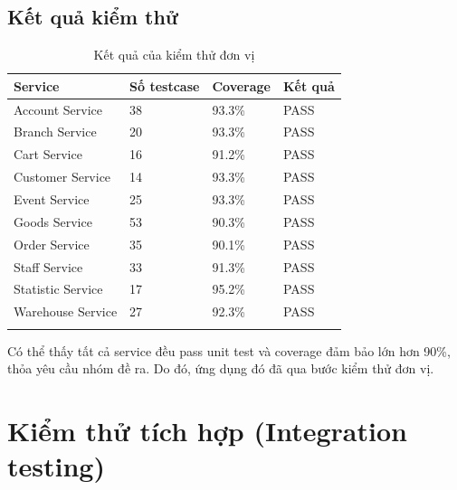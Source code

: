\subsection{Kết quả kiểm thử}
{
    \setlength\extrarowheight{6pt}
    \begin{longtable}{| p{4cm}| p{4cm}| p{4cm}| p{4cm} |}
        \hline
        \textbf{Service} &  \textbf{Số testcase}  & \textbf{Coverage} & \textbf{Kết quả} \\
        \hline
        Account Service  &  38  & 93.3\%            & PASS             \\
        \hline
        Branch Service  &  20  & 93.3\%            & PASS             \\
        \hline
        Cart Service  &  16   & 91.2\%            & PASS             \\
        \hline
        Customer Service  &  14  & 93.3\%            & PASS             \\
        \hline
        Event Service  &   25   & 93.3\%            & PASS             \\
        \hline
        Goods Service  &   53   & 90.3\%            & PASS             \\
        \hline
        Order Service  &   35   & 90.1\%            & PASS             \\
        \hline
        Staff Service  &  33   & 91.3\%            & PASS             \\
        \hline
        Statistic Service  & 17 & 95.2\%            & PASS             \\
        \hline
        Warehouse Service  &  27  & 92.3\%            & PASS             \\
        \hline
        \caption{Kết quả của kiểm thử đơn vị}
    \end{longtable}
}

Có thể thấy tất cả service đều pass unit test và coverage đảm bảo lớn hơn 90\%, thỏa yêu cầu nhóm đề ra. Do đó, ứng dụng đó đã qua bước kiểm thử đơn vị.

\newpage
\section{Kiểm thử tích hợp (Integration testing)}
